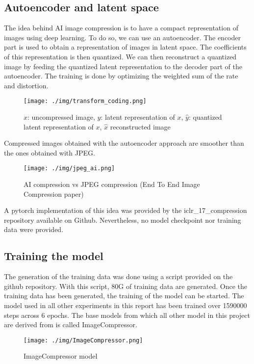 \documentclass[12pt]{article}
\begin{document}
\subsection{Autoencoder and latent space}
The idea behind AI image compression is to have a compact representation of images using deep learning. To do so, we can use an autoencoder. The encoder part is used to obtain a representation of images in latent space. The coefficients of this representation is then quantized. We can then reconstruct a quantized image by feeding the quantized latent representation to the decoder part of the autoencoder. The training is done by optimizing the weighted sum of the rate and distortion.
\begin{figure}[H]
    \centering
    \texttt{[image: ./img/transform\_coding.png]}
    \caption[Representation of images]{$x$: uncompressed image, $y$: latent representation of $x$, $\hat{y}$: quantized latent representation of $x$, $\hat{x}$ reconstructed image}
\end{figure}
Compressed images obtained with the autoencoder approach are smoother than the ones obtained with JPEG.
\begin{figure}
    \centering
    \texttt{[image: ./img/jpeg\_ai.png]}
    \caption[AI compression vs JPEG]{AI compression vs JPEG compression (End To End Image Compression paper)}
\end{figure}

A pytorch implementation of this idea was provided by the iclr\_17\_compression repository available on Github. Nevertheless, no model checkpoint nor training data were provided.


\subsection{Training the model}
The generation of the training data was done using a script provided on the github repository. With this script, 80G of training data are generated. Once the training data has been generated, the training of the model can be started. The model used in all other experiments in this report has been trained over 1590000 steps across 6 epochs. The base models from which all other model in this project are derived from is called ImageCompressor.
\begin{figure}[H]
    \centering
    \texttt{[image: ./img/ImageCompressor.png]}
    \caption[ImageCompressor model]{ImageCompressor model}
\end{figure}
\end{document}
